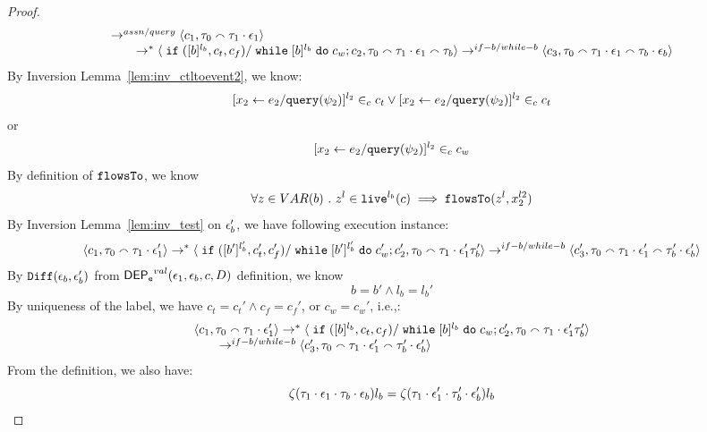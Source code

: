 \begin{proof}
\begin{equation}
\begin{array}{l}
\rightarrow^{assn/query}
 \langle c_1, \mathtt{\tau}_0 \smallfrown \mathtt{\tau}_1 \cdot \mathtt{\epsilon}_1 \rangle 
 \\ \qquad 
 \rightarrow^{*} 
  \langle \;\mathtt{if}\;([b]{}^{l_b}, c_t, c_f) / \;\mathtt{while}\; [b]{}^{l_b} \;\mathtt{do}\; c_w; {c}_2, 
  \mathtt{\tau}_0 \smallfrown \mathtt{\tau}_1 \cdot \mathtt{\epsilon}_1 \smallfrown \mathtt{\tau}_b \rangle 
  \rightarrow^{if-b / while-b} 
  \langle {c}_3,  \mathtt{\tau}_0 \smallfrown \mathtt{\tau}_1 \cdot \mathtt{\epsilon}_1 \smallfrown \mathtt{\tau}_b \cdot \mathtt{\epsilon}_b \rangle 
\end{array}
\end{equation}
%
By Inversion Lemma~\ref{lem:inv_ctltoevent2}, we know:
\[
  [\mathrel{ {x}_2 \leftarrow e_2 / {\tt query}(\psi_2) }]^{l_2} \in_c c_t
  \lor
  [\mathrel{ {x}_2 \leftarrow e_2 / {\tt query}(\psi_2) }]^{l_2} \in_c c_t
\]
or
\[
    [\mathrel{ {x}_2 \leftarrow e_2 / {\tt query}(\psi_2) }]^{l_2} \in_c c_w
\]
%
By definition of $\mathtt{flowsTo}$, we know
\begin{equation}
\label{eq:ctldep_btoevent2}
 \forall z \in VAR(b) ~.~ z^l \in \mathtt{live}^{l_b}(c) \implies \mathtt{flowsTo}(z^l, x_2^{l2})
\end{equation} 
%
By Inversion Lemma~\ref{lem:inv_test} on $\mathtt{\epsilon}_b'$, we have following execution instance: 
 \[
  \langle c_1, \mathtt{\tau}_0 \smallfrown \mathtt{\tau}_1 \cdot \mathtt{\epsilon}_1' \rangle 
  \rightarrow^{*} 
  \langle \;\mathtt{if}\;([b']{}^{l_b'}, c_t', c_f') / \;\mathtt{while}\; [b']{}^{l_b'} \;\mathtt{do}\; c_w'; {c}_2',
  \mathtt{\tau}_0 \smallfrown \mathtt{\tau}_1 \cdot \mathtt{\epsilon}_1' \mathtt{\tau}_b' \rangle 
  \rightarrow^{if-b / while-b} 
  \langle {c}_3',  \mathtt{\tau}_0 \smallfrown \mathtt{\tau}_1 \cdot \mathtt{\epsilon}_1' \smallfrown \mathtt{\tau}_b' \cdot \mathtt{\epsilon}_b' \rangle 
 \]
 By $\mathtt{Diff}(\mathtt{\epsilon}_b,\mathtt{\epsilon}_b' )$ from $\mathsf{DEP_{\mathtt{e}}}^{val}(\mathtt{\epsilon}_1, \mathtt{\epsilon}_b, c, D)$ definition, we know
 \[
 b = b' \land l_b = l_b'
 \]
 By uniqueness of the label, we have $c_t = c_t' \land c_f = c_f'$, or $c_w = c_w'$, i.e.,:
 \begin{equation}
\label{eq:ctldep_inv2}
  \begin{array}{l}   
\langle c_1, \mathtt{\tau}_0 \smallfrown \mathtt{\tau}_1 \cdot \mathtt{\epsilon}_1' \rangle 
  \rightarrow^{*} 
  \langle \;\mathtt{if}\;([b]{}^{l_b}, c_t, c_f) / \;\mathtt{while}\; [b]{}^{l_b} \;\mathtt{do}\; c_w; {c}_2',
   \mathtt{\tau}_0 \smallfrown \mathtt{\tau}_1 \cdot \mathtt{\epsilon}_1' \mathtt{\tau}_b' \rangle 
   \\ \qquad
  \rightarrow^{if-b / while-b} 
  \langle {c}_3',  \mathtt{\tau}_0 \smallfrown \mathtt{\tau}_1 \cdot \mathtt{\epsilon}_1' \smallfrown \mathtt{\tau}_b' \cdot \mathtt{\epsilon}_b' \rangle 
\end{array}
\end{equation}
%
From the definition, we also have:
\[
  \mathtt{\zeta}(\mathtt{\tau}_1 \cdot \mathtt{\epsilon}_1 \cdot \mathtt{\tau}_b\cdot \mathtt{\epsilon}_b) l_b
= 
\mathtt{\zeta}(\mathtt{\tau}_1 \cdot \mathtt{\epsilon}_1' \cdot \mathtt{\tau}_b'\cdot \mathtt{\epsilon}_b') l_b
\]
\end{proof}
